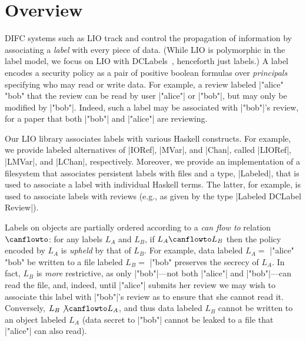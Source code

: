\section{Overview}
\label{sec:overview}

DIFC systems such as LIO track and control the propagation of
information by associating a \emph{label} with every piece of data.
%
(While LIO is polymorphic in the label model, we focus on LIO with
DCLabels~\cite{dclabels}, henceforth just labels.)
%
A label encodes a security policy as a pair of positive boolean
formulas over \emph{principals} specifying who may read or write data.
%
For example, a review labeled \hs|"alice" \/ "bob" %
that the review can be read by user \hs|"alice"| or \hs|"bob"|, but
may only be modified by \hs|"bob"|.
%
Indeed, such a label may be associated with \hs|"bob"|'s review, for a
paper that both \hs|"bob"| and \hs|"alice"| are reviewing.
%

Our LIO library associates labels with various Haskell constructs.
%
For example, we provide labeled alternatives of \hs|IORef|, \hs|MVar|,
and \hs|Chan|, called \hs|LIORef|, \hs|LMVar|, and \hs|LChan|,
respectively.
%
Moreover, we provide an implementation of a filesystem that associates
persistent labels with files and a type, \hs|Labeled|, that is used to
associate a label with individual Haskell terms.
%
The latter, for example, is used to associate labels with reviews (e.g.,
as given by the type \hs|Labeled DCLabel Review|).

Labels on objects are partially ordered according to a {\em can flow
  to} relation $\canflowto$: for any labels $L_A$ and $L_B$, if $L_A
  \canflowto L_B$ then the policy encoded by $L_A$ is \emph{upheld}
  by that of $L_B$.
%
For example, data labeled $L_A =$ \hs|"alice" \/ "bob" %
be written to a file labeled $L_B =$ \hs|"bob" %
preserves the secrecy of $L_A$.
%
In fact, $L_B$ is \emph{more} restrictive, as only
\hs|"bob"|---not both \hs|"alice"| and \hs|"bob"|---can read the file,
and, indeed, until \hs|"alice"| submits her review we may wish to
associate this label with \hs|"bob"|'s review as to ensure that she
cannot read it.
%
Conversely, $L_B \not\canflowto L_A$, and thus data labeled $L_B$
cannot be written to an object labeled $L_A$ (data secret to
\hs|"bob"| cannot be leaked to a file that \hs|"alice"| can also
read).

